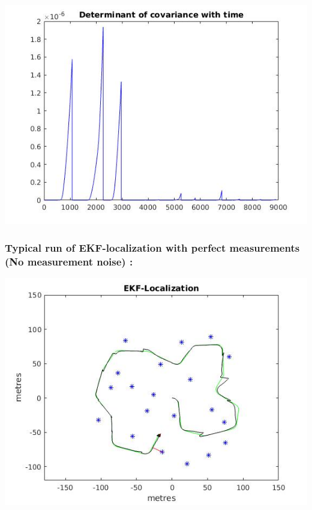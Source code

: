 \documentclass[a4paper,fleqn,11pt]{article}
\theoremstyle{mytheor}
\begin{document}
\begin{center}
\includegraphics[scale = 0.37]{../images/EKF-perfect-control-cvt.jpg}
\end{center}

\subsubsection{Typical run of EKF-localization with perfect measurements (No measurement noise) :}

\begin{center}
\includegraphics[scale = 0.74]{../images/EKF-perfect-measurement.jpg} \\
\end{center}
\end{document}
